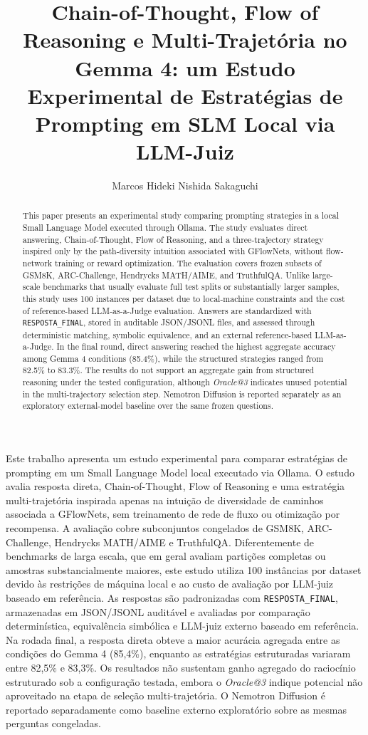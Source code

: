 \documentclass[12pt]{article}
\title{Chain-of-Thought, Flow of Reasoning e Multi-Trajetória no Gemma 4: um Estudo Experimental de Estratégias de Prompting em SLM Local via LLM-Juiz}
\author{Marcos Hideki Nishida Sakaguchi\inst{1}}
\makeatletter
\newcommand{\oracle}{\mbox{\textit{Oracle@3}}}
\makeatother
\begin{document}
\maketitle

\begin{abstract}
This paper presents an experimental study comparing prompting strategies in a local Small Language Model executed through Ollama. The study evaluates direct answering, Chain-of-Thought, Flow of Reasoning, and a three-trajectory strategy inspired only by the path-diversity intuition associated with GFlowNets, without flow-network training or reward optimization. The evaluation covers frozen subsets of GSM8K, ARC-Challenge, Hendrycks MATH/AIME, and TruthfulQA. Unlike large-scale benchmarks that usually evaluate full test splits or substantially larger samples, this study uses 100 instances per dataset due to local-machine constraints and the cost of reference-based LLM-as-a-Judge evaluation. Answers are standardized with \texttt{RESPOSTA\_FINAL}, stored in auditable JSON/JSONL files, and assessed through deterministic matching, symbolic equivalence, and an external reference-based LLM-as-a-Judge. In the final round, direct answering reached the highest aggregate accuracy among Gemma 4 conditions (85.4\%), while the structured strategies ranged from 82.5\% to 83.3\%. The results do not support an aggregate gain from structured reasoning under the tested configuration, although \oracle{} indicates unused potential in the multi-trajectory selection step. Nemotron Diffusion is reported separately as an exploratory external-model baseline over the same frozen questions.
\end{abstract}

\begin{resumo}
Este trabalho apresenta um estudo experimental para comparar estratégias de prompting em um Small Language Model local executado via Ollama. O estudo avalia resposta direta, Chain-of-Thought, Flow of Reasoning e uma estratégia multi-trajetória inspirada apenas na intuição de diversidade de caminhos associada a GFlowNets, sem treinamento de rede de fluxo ou otimização por recompensa. A avaliação cobre subconjuntos congelados de GSM8K, ARC-Challenge, Hendrycks MATH/AIME e TruthfulQA. Diferentemente de benchmarks de larga escala, que em geral avaliam partições completas ou amostras substancialmente maiores, este estudo utiliza 100 instâncias por dataset devido às restrições de máquina local e ao custo de avaliação por LLM-juiz baseado em referência. As respostas são padronizadas com \texttt{RESPOSTA\_FINAL}, armazenadas em JSON/JSONL auditável e avaliadas por comparação determinística, equivalência simbólica e LLM-juiz externo baseado em referência. Na rodada final, a resposta direta obteve a maior acurácia agregada entre as condições do Gemma 4 (85,4\%), enquanto as estratégias estruturadas variaram entre 82,5\% e 83,3\%. Os resultados não sustentam ganho agregado do raciocínio estruturado sob a configuração testada, embora o \oracle{} indique potencial não aproveitado na etapa de seleção multi-trajetória. O Nemotron Diffusion é reportado separadamente como baseline externo exploratório sobre as mesmas perguntas congeladas.
\end{resumo}
\end{document}
